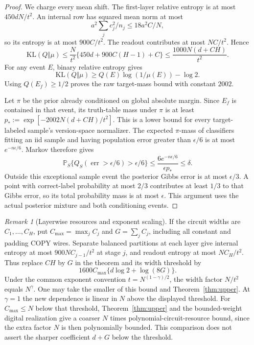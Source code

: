 \documentclass[11pt]{article}
\theoremstyle{remark}\newtheorem{remark}[theorem]{Remark}
\newcommand{\Prb}{\mathbb P}
\begin{document}
\begin{proof}
We charge every mean shift. The first-layer relative entropy is
at most $450dN/t^2$. An internal row has squared mean norm at most
\[
 a^2\sum_jc_j^2/n_j\le18a^2C/N,
\]
so its entropy is at most $900C/t^2$. The readout contributes
at most $NC/t^2$. Hence
\[
 \mathrm{KL}(Q\Vert\mu)
 \le\frac N{t^2}\{450d+900C(H-1)+C\}
 \le\frac{1000N(d+CH)}{t^2}.
\]
For any event $E$, binary relative entropy gives
\[
 \mathrm{KL}(Q\Vert\mu)
 \ge Q(E)\log(1/\mu(E))-\log2.
\]
Using $Q(E_f)\ge1/2$ proves the raw target-mass bound with
constant $2002$.

Let $\pi$ be the prior already conditioned on global absolute
margin. Since $E_f$ is contained in that event, its truth-table
mass under $\pi$ is at least
$p_*:=\exp[-2002N(d+CH)/t^2]$. This is a lower bound for every
target-labeled sample's version-space normalizer. The expected
$\pi$-mass of classifiers fitting an iid sample and having
population error greater than $\epsilon/6$ is at most
$e^{-n\epsilon/6}$. Markov therefore gives
\[
 \Prb_S\{Q_S(\operatorname{err}>\epsilon/6)>\epsilon/6\}
 \le\frac{6e^{-n\epsilon/6}}{\epsilon p_*}\le\delta.
\]
Outside this exceptional sample event the posterior Gibbs error
is at most $\epsilon/3$. A point with correct-label probability
at most $2/3$ contributes at least $1/3$ to that Gibbs error, so
its total probability mass is at most $\epsilon$. This argument
uses the actual posterior mixture and both conditioning events.
\end{proof}

\begin{remark}[Layerwise resources and exponent scaling]
If the circuit widths are $C_1,\ldots,C_H$, put
$C_{\max}=\max_jC_j$ and $G=\sum_jC_j$, including all constant
and padding COPY wires. Separate balanced partitions at each
layer give internal entropy at most $900NC_{j-1}/t^2$ at stage
$j$, and readout entropy at most $NC_H/t^2$. Thus replace $CH$
by $G$ in the theorem and its width threshold by
\[
 1600C_{\max}\{d\log2+\log(8G)\}.
\]
Under the common exponent convention
$t=N^{(1-\gamma)/2}$, the width factor $N/t^2$ equals $N^\gamma$.
One may take the smaller of this bound and Theorem~\ref{thm:upper}.
At $\gamma=1$ the new dependence is linear in $N$ above the
displayed threshold. For $C_{\max}\le N$ below that threshold,
Theorem~\ref{thm:upper} and the bounded-weight digital realization
give a coarser $N$ times polynomial-circuit-resource bound, since
the extra factor $N$ is then polynomially bounded. This comparison
does not assert the sharper coefficient $d+G$ below the threshold.
\end{remark}
\end{document}
